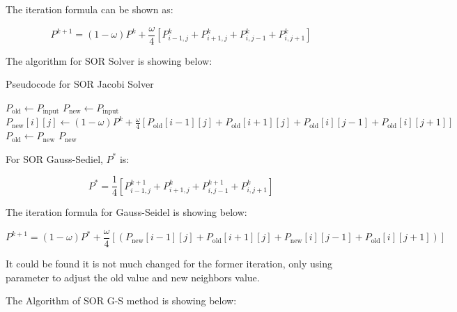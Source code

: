 \documentclass[12pt]{article}
\begin{document}
The iteration formula can be shown as:


\begin{equation}
    P^{k+1} = (1-\omega)P^{k} + \frac{\omega}{4} \left[ P^{k}_{i-1,j} + P^{k}_{i+1,j} + P^{k}_{i,j-1} + P^{k}_{i,j+1} \right]
\end{equation}


The algorithm for SOR Solver is showing below:



\begin{algorithm}
    \caption{Pseudocode for SOR Jacobi Solver}
    \begin{algorithmic}[1]
        \State $P_{\text{old}} \gets P_{\text{input}}$
        \State $P_{\text{new}} \gets P_{\text{input}}$
                \State $P_{\text{new}}[i][j] \gets 
                (1-\omega)P^{k} + \frac{\omega}{4} \left[ P_{\text{old}}[i-1][j] + P_{\text{old}}[i+1][j] + P_{\text{old}}[i][j-1] + P_{\text{old}}[i][j+1] \right]$
                \State $P_{\text{old}} \gets P_{\text{new}}$
            \EndFor
        \EndFor
        \State \Return $P_{\text{new}}$
        \EndFunction
    \end{algorithmic}
\end{algorithm}




For SOR Gauss-Sediel, $P^*$ is: 


\begin{equation}
    P^* = \frac{1}{4} \left[ P^{k+1}_{i-1,j} + P^{k}_{i+1,j} + P^{k+1}_{i,j-1} + P^{k}_{i,j+1} \right]
\end{equation}


The iteration formula for Gauss-Seidel is showing below:



\begin{equation}
    P^{k+1} = (1-\omega)P^{*} + \frac{\omega}{4} \left[ (P_{\text{new}}[i-1][j] + P_{\text{old}}[i+1][j] + P_{\text{new}}[i][j-1] + P_{\text{old}}[i][j+1]) \right]
\end{equation}

It could be found it is not much changed for the former iteration, only using 
parameter to adjust the old value and new neighbors value.



The Algorithm of SOR G-S method is showing below:
\end{document}

